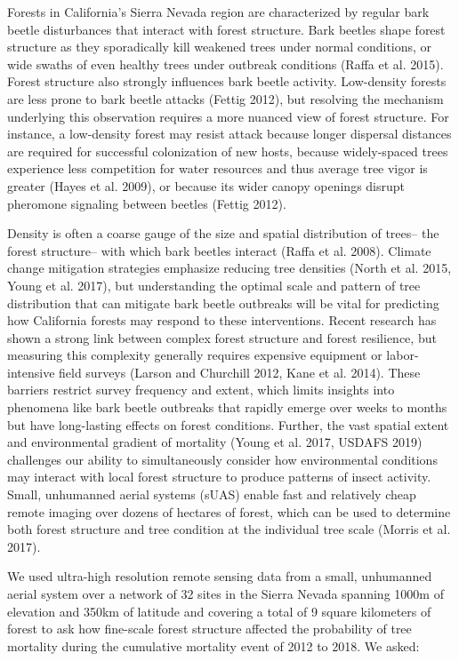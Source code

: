\documentclass[]{article}
\begin{document}
Forests in California's Sierra Nevada region are characterized by
regular bark beetle disturbances that interact with forest structure.
Bark beetles shape forest structure as they sporadically kill weakened
trees under normal conditions, or wide swaths of even healthy trees
under outbreak conditions (Raffa et al. 2015). Forest structure also
strongly influences bark beetle activity. Low-density forests are less
prone to bark beetle attacks (Fettig 2012), but resolving the mechanism
underlying this observation requires a more nuanced view of forest
structure. For instance, a low-density forest may resist attack because
longer dispersal distances are required for successful colonization of
new hosts, because widely-spaced trees experience less competition for
water resources and thus average tree vigor is greater (Hayes et al.
2009), or because its wider canopy openings disrupt pheromone signaling
between beetles (Fettig 2012).

Density is often a coarse gauge of the size and spatial distribution of
trees-- the forest structure-- with which bark beetles interact (Raffa
et al. 2008). Climate change mitigation strategies emphasize reducing
tree densities (North et al. 2015, Young et al. 2017), but understanding
the optimal scale and pattern of tree distribution that can mitigate
bark beetle outbreaks will be vital for predicting how California
forests may respond to these interventions. Recent research has shown a
strong link between complex forest structure and forest resilience, but
measuring this complexity generally requires expensive equipment or
labor-intensive field surveys (Larson and Churchill 2012, Kane et al.
2014). These barriers restrict survey frequency and extent, which limits
insights into phenomena like bark beetle outbreaks that rapidly emerge
over weeks to months but have long-lasting effects on forest conditions.
Further, the vast spatial extent and environmental gradient of mortality
(Young et al. 2017, USDAFS 2019) challenges our ability to
simultaneously consider how environmental conditions may interact with
local forest structure to produce patterns of insect activity. Small,
unhumanned aerial systems (sUAS) enable fast and relatively cheap remote
imaging over dozens of hectares of forest, which can be used to
determine both forest structure and tree condition at the individual
tree scale (Morris et al. 2017).

We used ultra-high resolution remote sensing data from a small,
unhumanned aerial system over a network of 32 sites in the Sierra Nevada
spanning 1000m of elevation and 350km of latitude and covering a total
of 9 square kilometers of forest to ask how fine-scale forest structure
affected the probability of tree mortality during the cumulative
mortality event of 2012 to 2018. We asked:
\end{document}
